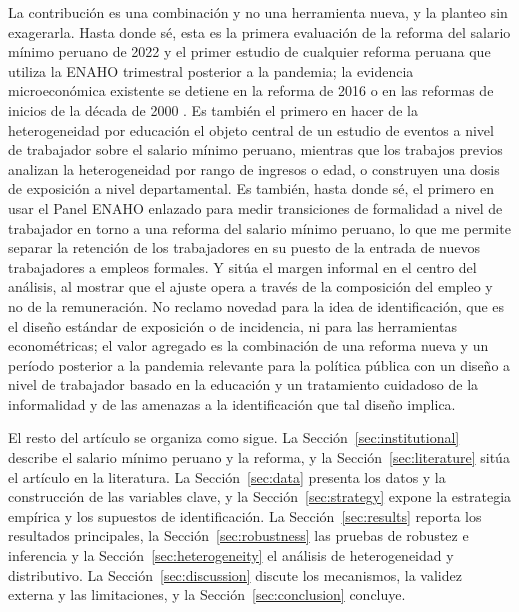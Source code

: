La contribución es una combinación y no una herramienta nueva, y la planteo sin exagerarla. Hasta donde sé, esta es la primera evaluación de la reforma del salario mínimo peruano de 2022 y el primer estudio de cualquier reforma peruana que utiliza la ENAHO trimestral posterior a la pandemia; la evidencia microeconómica existente se detiene en la reforma de 2016 \citep{jimenez_2023} o en las reformas de inicios de la década de 2000 \citep{jaramillo_lopez_2006, cespedes_2005}. Es también el primero en hacer de la heterogeneidad por educación el objeto central de un estudio de eventos a nivel de trabajador sobre el salario mínimo peruano, mientras que los trabajos previos analizan la heterogeneidad por rango de ingresos o edad, o construyen una dosis de exposición a nivel departamental. Es también, hasta donde sé, el primero en usar el Panel ENAHO enlazado para medir transiciones de formalidad a nivel de trabajador en torno a una reforma del salario mínimo peruano, lo que me permite separar la retención de los trabajadores en su puesto de la entrada de nuevos trabajadores a empleos formales. Y sitúa el margen informal en el centro del análisis, al mostrar que el ajuste opera a través de la composición del empleo y no de la remuneración. No reclamo novedad para la idea de identificación, que es el diseño estándar de exposición o de incidencia, ni para las herramientas econométricas; el valor agregado es la combinación de una reforma nueva y un período posterior a la pandemia relevante para la política pública con un diseño a nivel de trabajador basado en la educación y un tratamiento cuidadoso de la informalidad y de las amenazas a la identificación que tal diseño implica.

El resto del artículo se organiza como sigue. La Sección~\ref{sec:institutional} describe el salario mínimo peruano y la reforma, y la Sección~\ref{sec:literature} sitúa el artículo en la literatura. La Sección~\ref{sec:data} presenta los datos y la construcción de las variables clave, y la Sección~\ref{sec:strategy} expone la estrategia empírica y los supuestos de identificación. La Sección~\ref{sec:results} reporta los resultados principales, la Sección~\ref{sec:robustness} las pruebas de robustez e inferencia y la Sección~\ref{sec:heterogeneity} el análisis de heterogeneidad y distributivo. La Sección~\ref{sec:discussion} discute los mecanismos, la validez externa y las limitaciones, y la Sección~\ref{sec:conclusion} concluye.
